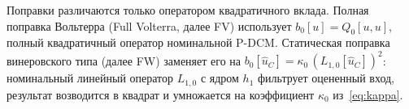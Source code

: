 Поправки различаются только оператором квадратичного вклада. Полная поправка Вольтерра (Full Volterra, далее FV) использует $b_0[u]=Q_0[u,u]$, полный квадратичный оператор номинальной P-DCM. Статическая поправка винеровского типа (далее FW) заменяет его на $b_0[\hat u_C]=\kappa_0\,(L_{1,0}[\hat u_C])^2$: номинальный линейный оператор $L_{1,0}$ с ядром $h_1$ фильтрует оцененный вход, результат возводится в квадрат и умножается на коэффициент $\kappa_0$ из~\eqref{eq:kappa}.
